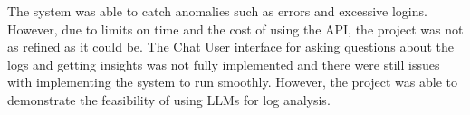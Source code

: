 \documentclass[sigconf]{acmart}
\begin{document}
The system was able to catch anomalies such as errors and excessive logins. However, due to limits on time and the cost of using the API, the project was not as refined as it could be. The Chat User interface for asking questions about the logs and getting insights was not fully implemented and there were still issues with implementing the system to run smoothly. However, the project was able to demonstrate the feasibility of using LLMs for log analysis.





\end{document}
